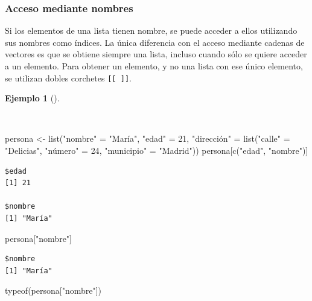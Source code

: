 \documentclass[
  spanish,
  a4paper,
]{scrreport}
\newenvironment{Shaded}{\begin{snugshade}}{\end{snugshade}}
\newcommand{\DecValTok}[1]{\textcolor[rgb]{0.68,0.00,0.00}{#1}}
\newcommand{\FunctionTok}[1]{\textcolor[rgb]{0.28,0.35,0.67}{#1}}
\newcommand{\NormalTok}[1]{\textcolor[rgb]{0.00,0.23,0.31}{#1}}
\newcommand{\OtherTok}[1]{\textcolor[rgb]{0.00,0.23,0.31}{#1}}
\newcommand{\StringTok}[1]{\textcolor[rgb]{0.13,0.47,0.30}{#1}}
\theoremstyle{definition}
\theoremstyle{definition}
\newtheorem{example}{Ejemplo}[chapter]
\theoremstyle{remark}
\begin{document}
\subsubsection{Acceso mediante nombres}\label{acceso-mediante-nombres}

Si los elementos de una lista tienen nombre, se puede acceder a ellos
utilizando sus nombres como índices. La única diferencia con el acceso
mediante cadenas de vectores es que se obtiene siempre una lista,
incluso cuando sólo se quiere acceder a un elemento. Para obtener un
elemento, y no una lista con ese único elemento, se utilizan dobles
corchetes \texttt{{[}{[}\ {]}{]}}.

\begin{example}[]\protect\hypertarget{exm-acceso-listas-nombres}{}\label{exm-acceso-listas-nombres}

~

\begin{Shaded}
\begin{Highlighting}[]
\NormalTok{persona }\OtherTok{\textless{}{-}} \FunctionTok{list}\NormalTok{(}\StringTok{"nombre"} \OtherTok{=} \StringTok{"María"}\NormalTok{, }\StringTok{"edad"} \OtherTok{=} \DecValTok{21}\NormalTok{, }\StringTok{"dirección"} \OtherTok{=} \FunctionTok{list}\NormalTok{(}\StringTok{"calle"} \OtherTok{=} \StringTok{"Delicias"}\NormalTok{, }\StringTok{"número"} \OtherTok{=} \DecValTok{24}\NormalTok{, }\StringTok{"municipio"} \OtherTok{=} \StringTok{"Madrid"}\NormalTok{))}
\NormalTok{persona[}\FunctionTok{c}\NormalTok{(}\StringTok{"edad"}\NormalTok{, }\StringTok{"nombre"}\NormalTok{)]}
\end{Highlighting}
\end{Shaded}

\begin{verbatim}
$edad
[1] 21

$nombre
[1] "María"
\end{verbatim}

\begin{Shaded}
\begin{Highlighting}[]
\NormalTok{persona[}\StringTok{"nombre"}\NormalTok{]}
\end{Highlighting}
\end{Shaded}

\begin{verbatim}
$nombre
[1] "María"
\end{verbatim}

\begin{Shaded}
\begin{Highlighting}[]
\FunctionTok{typeof}\NormalTok{(persona[}\StringTok{"nombre"}\NormalTok{])}
\end{Highlighting}
\end{Shaded}


\end{example}
\end{document}
